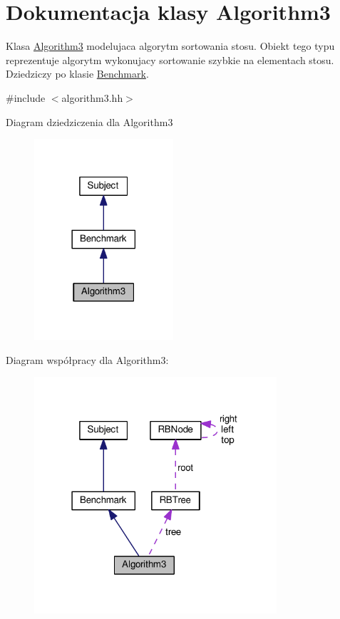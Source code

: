 \hypertarget{class_algorithm3}{\section{Dokumentacja klasy Algorithm3}
\label{class_algorithm3}
}


Klasa \hyperlink{class_algorithm3}{Algorithm3} modelujaca algorytm sortowania stosu. Obiekt tego typu reprezentuje algorytm wykonujacy sortowanie szybkie na elementach stosu. Dziedziczy po klasie \hyperlink{class_benchmark}{Benchmark}.  




{\ttfamily \#include $<$algorithm3.\-hh$>$}



Diagram dziedziczenia dla Algorithm3
\nopagebreak
\begin{figure}[H]
\begin{center}
\leavevmode
\includegraphics[width=146pt]{class_algorithm3__inherit__graph}
\end{center}
\end{figure}


Diagram współpracy dla Algorithm3\-:
\nopagebreak
\begin{figure}[H]
\begin{center}
\leavevmode
\includegraphics[width=255pt]{class_algorithm3__coll__graph}
\end{center}
\end{figure}
